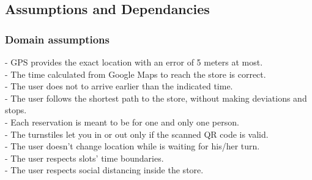 \documentclass{article}
\begin{document}
\subsection{Assumptions and Dependancies}
\subsubsection{Domain assumptions}
\noindent\medskip
[D1] - GPS provides the exact location with an error of 5 meters at most.\\
\noindent\medskip
[D2] - The time calculated from Google Maps to reach the store is correct.\\
\noindent\medskip
[D3] - The user does not to arrive earlier than the indicated time.\\
\noindent\medskip
[D4] - The user follows the shortest path to the store, without making deviations and stops.\\
\noindent\medskip
[D5] - Each reservation is meant to be for one and only one person.\\
\noindent\medskip
[D6] - The turnstiles let you in or out only if the scanned QR code is valid.\\
\noindent\medskip
[D7] - The user doesn't change location while is waiting for his/her turn.\\
\noindent\medskip
[D8] - The user respects slots' time boundaries.\\
\noindent\medskip
[D9] - The user respects social distancing inside the store.\\
\end{document}
